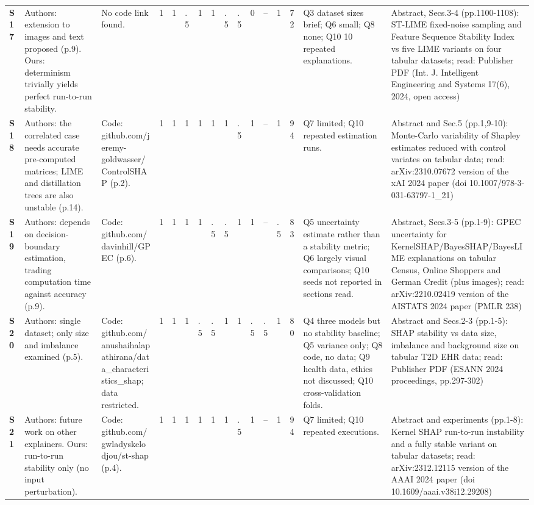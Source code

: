 \begin{longtable}{@{}P{1.0cm}P{4.6cm}P{3.6cm}P{0.3cm}P{0.3cm}P{0.3cm}P{0.3cm}P{0.3cm}P{0.3cm}P{0.3cm}P{0.3cm}P{0.3cm}P{0.36cm}P{0.75cm}P{3.0cm}P{3.9cm}@{}}
\textbf{S17} & Authors: extension to images and text proposed (p.9). Ours: determinism trivially yields perfect run-to-run stability. & No code link found. & 1 & 1 & .5 & 1 & 1 & .5 & .5 & 0 & -- & 1 & 72 & Q3 dataset sizes brief; Q6 small; Q8 none; Q10 10 repeated explanations. & Abstract, Secs.3-4 (pp.1100-1108): ST-LIME fixed-noise sampling and Feature Sequence Stability Index vs five LIME variants on four tabular datasets; read: Publisher PDF (Int. J. Intelligent Engineering and Systems 17(6), 2024, open access) \\
\textbf{S18} & Authors: the correlated case needs accurate pre-computed matrices; LIME and distillation trees are also unstable (p.14). & Code: github.com/\allowbreak{}jeremy-goldwasser/\allowbreak{}ControlSHAP (p.2). & 1 & 1 & 1 & 1 & 1 & 1 & .5 & 1 & -- & 1 & 94 & Q7 limited; Q10 repeated estimation runs. & Abstract and Sec.5 (pp.1,9-10): Monte-Carlo variability of Shapley estimates reduced with control variates on tabular data; read: arXiv:2310.07672 version of the xAI 2024 paper (doi 10.1007/\allowbreak{}978-3-031-63797-1\_\allowbreak{}21) \\
\textbf{S19} & Authors: depends on decision-boundary estimation, trading computation time against accuracy (p.9). & Code: github.com/\allowbreak{}davinhill/\allowbreak{}GPEC (p.6). & 1 & 1 & 1 & 1 & .5 & .5 & 1 & 1 & -- & .5 & 83 & Q5 uncertainty estimate rather than a stability metric; Q6 largely visual comparisons; Q10 seeds not reported in sections read. & Abstract, Secs.3-5 (pp.1-9): GPEC uncertainty for KernelSHAP/\allowbreak{}BayesSHAP/\allowbreak{}BayesLIME explanations on tabular Census, Online Shoppers and German Credit (plus images); read: arXiv:2210.02419 version of the AISTATS 2024 paper (PMLR 238) \\
\textbf{S20} & Authors: single dataset; only size and imbalance examined (p.5). & Code: github.com/\allowbreak{}anushaihalapathirana/\allowbreak{}data\_\allowbreak{}characteristics\_\allowbreak{}shap; data restricted. & 1 & 1 & 1 & .5 & .5 & 1 & 1 & .5 & .5 & 1 & 80 & Q4 three models but no stability baseline; Q5 variance only; Q8 code, no data; Q9 health data, ethics not discussed; Q10 cross-validation folds. & Abstract and Secs.2-3 (pp.1-5): SHAP stability vs data size, imbalance and background size on tabular T2D EHR data; read: Publisher PDF (ESANN 2024 proceedings, pp.297-302) \\
\textbf{S21} & Authors: future work on other explainers. Ours: run-to-run stability only (no input perturbation). & Code: github.com/\allowbreak{}gwladyskelodjou/\allowbreak{}st-shap (p.4). & 1 & 1 & 1 & 1 & 1 & 1 & .5 & 1 & -- & 1 & 94 & Q7 limited; Q10 repeated executions. & Abstract and experiments (pp.1-8): Kernel SHAP run-to-run instability and a fully stable variant on tabular datasets; read: arXiv:2312.12115 version of the AAAI 2024 paper (doi 10.1609/\allowbreak{}aaai.v38i12.29208) \\

\end{longtable}
